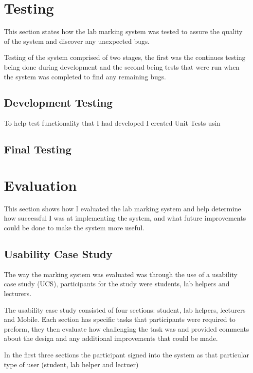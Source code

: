 \documentclass[12pt]{article}  %
\begin{document}
\newpage
\section{Testing}

This section states how the lab marking system was tested to assure the quality of the system and discover any unexpected bugs.

Testing of the system comprised of two stages, the first was the continues testing being done during development and the second being tests that were run when the system was completed to find any remaining bugs.


\subsection{Development Testing}
To help test functionality that I had developed I created Unit Tests usin
\subsection{Final Testing}


\newpage
\section{Evaluation}

This section shows how I evaluated the lab marking system and help determine how successful I was at implementing the system, and what future improvements could be done to make the system more useful. 

\subsection{Usability Case Study}
The way the marking system was evaluated was through the use of a usability case study (UCS), participants for the study were students, lab helpers and lecturers.


The usability case study consisted of four sections: student, lab helpers, lecturers and Mobile. Each section has specific tasks that participants were required to preform, they then evaluate how challenging the task was and provided comments about the design and any additional improvements that could be made. 

In the first three sections the participant signed into the system as that particular type of user (student, lab helper and lectuer) 
\end{document}
